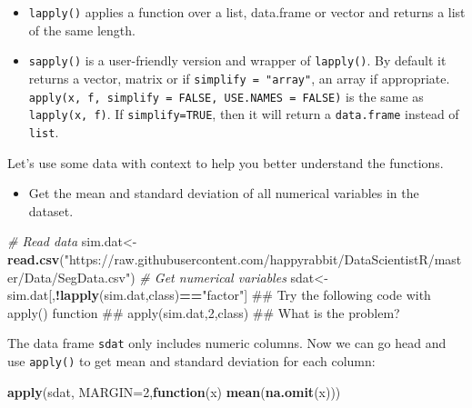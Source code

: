 \documentclass[12pt,]{krantz}
\makeatletter
\newenvironment{Shaded}{\begin{snugshade}}{\end{snugshade}}
\newcommand{\KeywordTok}[1]{\textcolor[rgb]{0.27,0.27,0.27}{\textbf{#1}}}
\newcommand{\DataTypeTok}[1]{\textcolor[rgb]{0.27,0.27,0.27}{#1}}
\newcommand{\DecValTok}[1]{\textcolor[rgb]{0.06,0.06,0.06}{#1}}
\newcommand{\StringTok}[1]{\textcolor[rgb]{0.5,0.5,0.5}{#1}}
\newcommand{\CommentTok}[1]{\textcolor[rgb]{0.37,0.37,0.37}{\textit{#1}}}
\newcommand{\ControlFlowTok}[1]{\textcolor[rgb]{0.27,0.27,0.27}{\textbf{#1}}}
\newcommand{\OperatorTok}[1]{\textcolor[rgb]{0.43,0.43,0.43}{\textbf{#1}}}
\newcommand{\NormalTok}[1]{#1}
\providecommand{\tightlist}{%
  \setlength{\itemsep}{0pt}\setlength{\parskip}{0pt}}
\newenvironment{kframe}{%
\medskip{}
\setlength{\fboxsep}{.8em}
 \def\at@end@of@kframe{}%
 \ifinner\ifhmode%
  \def\at@end@of@kframe{\end{minipage}}%
  \begin{minipage}{\columnwidth}%
 \fi\fi%
 \def\FrameCommand##1{\hskip\@totalleftmargin \hskip-\fboxsep
 \colorbox{shadecolor}{##1}\hskip-\fboxsep
     \hskip-\linewidth \hskip-\@totalleftmargin \hskip\columnwidth}%
 \MakeFramed {\advance\hsize-\width
   \@totalleftmargin\z@ \linewidth\hsize
   \@setminipage}}%
 {\par\unskip\endMakeFramed%
 \at@end@of@kframe}
\renewenvironment{Shaded}{\begin{kframe}}{\end{kframe}}
\theoremstyle{definition}
\theoremstyle{definition}
\theoremstyle{definition}
\theoremstyle{remark}
\makeatother
\begin{document}
\begin{itemize}
\tightlist
\item
  \texttt{lapply()} applies a function over a list, data.frame or vector
  and returns a list of the same length.
\item
  \texttt{sapply()} is a user-friendly version and wrapper of
  \texttt{lapply()}. By default it returns a vector, matrix or if
  \texttt{simplify\ =\ "array"}, an array if appropriate.
  \texttt{apply(x,\ f,\ simplify\ =\ FALSE,\ USE.NAMES\ =\ FALSE)} is
  the same as \texttt{lapply(x,\ f)}. If \texttt{simplify=TRUE}, then it
  will return a \texttt{data.frame} instead of \texttt{list}.
\end{itemize}

Let's use some data with context to help you better understand the
functions.

\begin{itemize}
\tightlist
\item
  Get the mean and standard deviation of all numerical variables in the
  dataset.
\end{itemize}

\begin{Shaded}
\begin{Highlighting}[]
\CommentTok{# Read data}
\NormalTok{sim.dat<-}\KeywordTok{read.csv}\NormalTok{(}\StringTok{"https://raw.githubusercontent.com/happyrabbit/DataScientistR/master/Data/SegData.csv"}\NormalTok{)}
\CommentTok{# Get numerical variables}
\NormalTok{sdat<-sim.dat[,}\OperatorTok{!}\KeywordTok{lapply}\NormalTok{(sim.dat,class)}\OperatorTok{==}\StringTok{"factor"}\NormalTok{]}
\NormalTok{## Try the following code with apply() function}
\NormalTok{## apply(sim.dat,2,class)}
\NormalTok{## What is the problem?}
\end{Highlighting}
\end{Shaded}

The data frame \texttt{sdat} only includes numeric columns. Now we can
go head and use \texttt{apply()} to get mean and standard deviation for
each column:

\begin{Shaded}
\begin{Highlighting}[]
\KeywordTok{apply}\NormalTok{(sdat, }\DataTypeTok{MARGIN=}\DecValTok{2}\NormalTok{,}\ControlFlowTok{function}\NormalTok{(x) }\KeywordTok{mean}\NormalTok{(}\KeywordTok{na.omit}\NormalTok{(x)))}
\end{Highlighting}
\end{Shaded}
\end{document}
